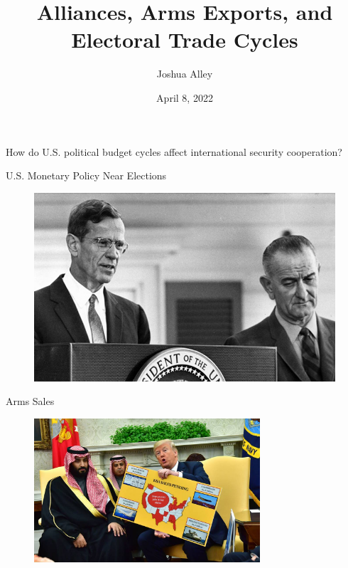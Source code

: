 \documentclass[12pt]{beamer}
\title{Alliances, Arms Exports, and Electoral Trade Cycles}
\date{April 8, 2022}
\author{Joshua Alley}
\institute{Democratic Statecraft Lab, University of Virginia}
\begin{document}
 \maketitle



 \begin{frame}[standout]

How do U.S. political budget cycles affect international security cooperation? 


 \end{frame}
 

\begin{frame}{U.S. Monetary Policy Near Elections}

\pause 
\begin{figure}[htbp]
		\includegraphics[height=0.75\textheight]{lbj-fed.jpg}
\end{figure}

\end{frame}
 

\begin{frame}{Arms Sales}

\begin{figure}[htbp]
		\includegraphics[width=0.75\textwidth]{trump-sales.jpg}
\end{figure}

\end{frame}
 
\end{document}
